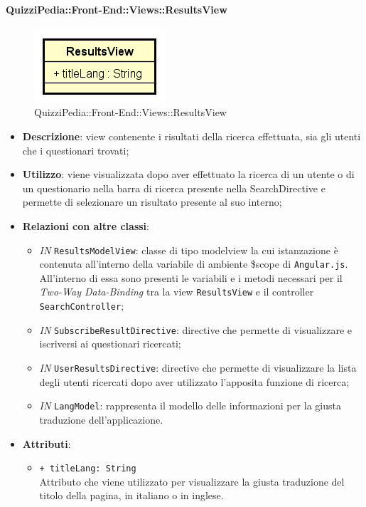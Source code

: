 	
\paragraph{QuizziPedia::Front-End::Views::ResultsView}
\begin{figure} [ht]
	\centering
	\includegraphics[scale=0.45]{UML/Classi/Front-End/QuizziPedia_Front-end_Views_ResultsView.png}
	\caption{QuizziPedia::Front-End::Views::ResultsView}
\end{figure} \FloatBarrier
\begin{itemize}
	\item \textbf{Descrizione}: view contenente i risultati della ricerca effettuata, sia gli utenti che i questionari trovati;
	\item \textbf{Utilizzo}: viene visualizzata dopo aver effettuato la ricerca di un utente o di un questionario nella barra di ricerca presente nella SearchDirective e permette di selezionare un risultato presente al suo interno; 
	\item \textbf{Relazioni con altre classi}:
	\begin{itemize}
		\item \textit{IN} \texttt{ResultsModelView}: classe di tipo modelview la cui istanzazione è contenuta all'interno della variabile di ambiente \$scope di \texttt{Angular.js}. All'interno di essa sono presenti le variabili e i metodi necessari per il \textit{Two-Way Data-Binding} tra la view \texttt{ResultsView} e il controller \texttt{SearchController};
		\item \textit{IN} \texttt{SubscribeResultDirective}: directive che permette di visualizzare e iscriversi ai questionari ricercati;
		\item \textit{IN} \texttt{UserResultsDirective}: directive che permette di visualizzare la lista degli utenti ricercati dopo aver utilizzato l'apposita funzione di ricerca;
		\item \textit{IN} \texttt{LangModel}: rappresenta il modello delle informazioni per la giusta traduzione dell'applicazione.
	\end{itemize}
	\item \textbf{Attributi}:
		\begin{itemize}
			\item \texttt{+ titleLang: String} \\ Attributo che viene utilizzato per visualizzare la giusta traduzione del titolo della pagina, in italiano o in inglese.
		\end{itemize}
\end{itemize}


